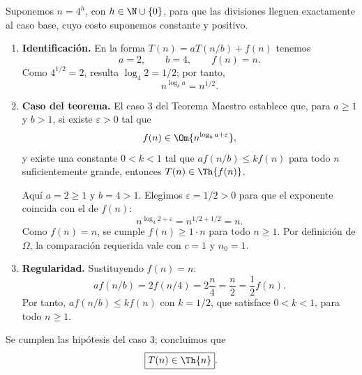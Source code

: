 
Suponemos $n=4^h$, con $h\in\N\cup\{0\}$, para que las divisiones lleguen exactamente al caso base, cuyo costo suponemos constante y positivo.

\begin{enumerate}
\item \textbf{Identificación.} En la forma $T(n)=aT(n/b)+f(n)$ tenemos
\[
a=2,\qquad b=4,\qquad f(n)=n.
\]
Como $4^{1/2}=2$, resulta $\log_4 2=1/2$; por tanto,
\[
n^{\log_b a}=n^{1/2}.
\]

\item \textbf{Caso del teorema.} El caso 3 del Teorema Maestro establece que, para $a\ge1$ y $b>1$, si existe $\varepsilon>0$ tal que
\[
f(n)\in\Om{n^{\log_b a+\varepsilon}},
\]
y existe una constante $0<k<1$ tal que $a f(n/b)\le k f(n)$ para todo $n$ suficientemente grande, entonces $T(n)\in\Th{f(n)}$.

Aquí $a=2\ge1$ y $b=4>1$. Elegimos $\varepsilon=1/2>0$ para que el exponente coincida con el de $f(n)$:
\[
n^{\log_4 2+\varepsilon}=n^{1/2+1/2}=n.
\]
Como $f(n)=n$, se cumple $f(n)\ge 1\cdot n$ para todo $n\ge1$. Por definición de $\Omega$, la comparación requerida vale con $c=1$ y $n_0=1$.

\item \textbf{Regularidad.} Sustituyendo $f(n)=n$:
\[
a f(n/b)=2f(n/4)=2\frac n4=\frac n2=\frac12 f(n).
\]
Por tanto, $a f(n/b)\le k f(n)$ con $k=1/2$, que satisface $0<k<1$, para todo $n\ge1$.
\end{enumerate}

Se cumplen las hipótesis del caso 3; concluimos que
\[
\boxed{T(n)\in\Th{n}}.
\]
\fin
